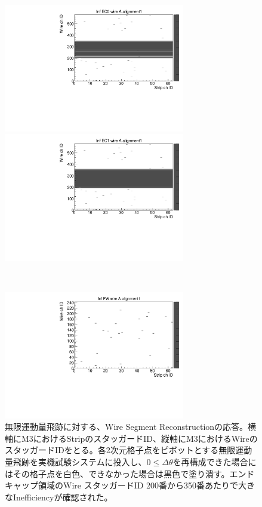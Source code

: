 \begin{figure}
    \begin{minipage}[b]{.5\linewidth}
        \centering
        \includegraphics[height=5.6cm]{fig/Test/B_InfEC0_wire.pdf}
    \end{minipage}
    \begin{minipage}[b]{.5\linewidth}
        \centering
        \includegraphics[height=5.6cm]{fig/Test/B_InfEC1_wire.pdf}
    \end{minipage}\\
    \begin{minipage}[b]{\linewidth}
        \centering
        \includegraphics[height=5.6cm]{fig/Test/B_InfFW_wire.pdf}
    \end{minipage}
    \caption[無限運動量飛跡に対する、Wire Segment Reconstructionの応答]{無限運動量飛跡に対する、Wire Segment Reconstructionの応答。横軸にM3におけるStripのスタッガードID、縦軸にM3におけるWireのスタッガードIDをとる。各2次元格子点をピボットとする無限運動量飛跡を実機試験システムに投入し、$0 \leq \Delta\theta$を再構成できた場合にはその格子点を白色、できなかった場合は黒色で塗り潰す。エンドキャップ領域のWire スタッガードID 200番から350番あたりで大きなInefficiencyが確認された。}
    \label{Inf_B_Wire}
\end{figure}

